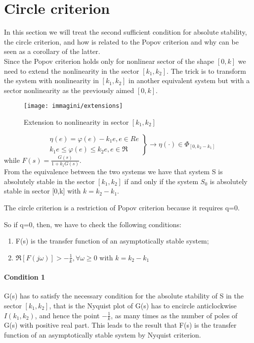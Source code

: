 \section{Circle criterion}
In this section we will treat the second sufficient condition for absolute stability, the circle criterion, and how is related to the Popov criterion and why can be seen as a corollary of the latter.\\
Since the Popov criterion holds only for nonlinear sector of the shape $[0,k]$ we need to extend the nonlinearity in the sector $[k_1,k_2]$. The trick is to transform the system with nonlinearity in  $[k_1,k_2]$  in another equivalent system but with a sector nonlinearity as the previously aimed $[0,k]$.
\begin{figure}[H]
	\centering
	\texttt{[image: immagini/extensions]}
	\caption{Extension to nonlinearity in sector $[k_1,k_2]$}
	\label{fig:extensions}
\end{figure}
\[
\left.
\begin{aligned}
	& \eta(e)=\varphi(e)-k_1e, e\in Re	\\
	& k_1e\le \varphi(e)\le k_2e,e \in \Re
\end{aligned}
\right\rbrace
\to \eta(\cdot)\in \Phi_{[0,k_2-k_1]}
\]while $F(s)=\frac{G(s)}{1+k_1G(s)}$.\\
From the equivalence between the two systems we have that system S is absolutely stable in the sector $[k_1,k_2]$ if and only if the system $S_0$ is absolutely stable in sector [0,k] with $k=k_2-k_1$.
\begin{note}
	The circle criterion is a restriction of Popov criterion because it requires q=0.
\end{note}
So if q=0, then, we have to check the following conditions:
\begin{enumerate}
	\item F(s) is the transfer function of an asymptotically stable system;
	\item $\Re[F(j\omega)]>-\frac{1}{k}, \forall \omega \ge0$ with $k=k_2-k_1$
\end{enumerate}
\paragraph{Condition 1} G(s) has to satisfy the necessary condition for the absolute stability of S in the sector $[k_1,k_2]$, that is the Nyquist plot of G(s) has to encircle anticlockwise $I(k_1,k_2)$, and hence the point $-\frac{1}{k}$, as many times as the number of poles of G(s) with positive real part. This leads to the result that F(s) is the transfer function of an asymptotically stable system by Nyquist criterion.
